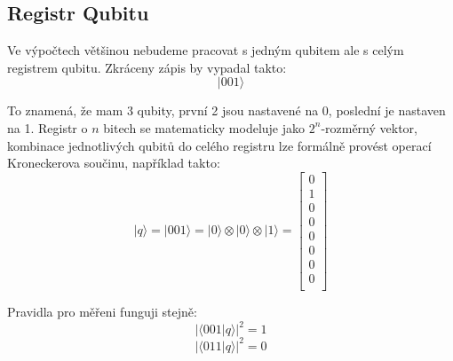 \documentclass[11pt]{article}
\begin{document}
\subsection{Registr Qubitu}
Ve výpočtech většinou nebudeme pracovat s jedným qubitem ale s celým registrem qubitu. Zkráceny zápis by vypadal takto:
$$|001\rangle$$
\par To znamená, že mam 3 qubity, první 2 jsou nastavené na 0, poslední je nastaven na 1.
Registr o $n$ bitech se matematicky modeluje jako $2^n$-rozměrný vektor, kombinace jednotlivých qubitů do celého registru lze formálně provést operací Kroneckerova součinu, například takto:
$$|q\rangle = |001\rangle = |0\rangle \otimes |0\rangle \otimes |1\rangle = \begin{bmatrix}
        0 \\
        1 \\
        0 \\
        0 \\
        0 \\
        0 \\
        0 \\
        0 \\
    \end{bmatrix}$$
\par Pravidla pro měřeni funguji stejně:
$$|\langle001|q\rangle|^2 = 1$$
$$|\langle 011|q\rangle|^2 = 0$$
\end{document}

